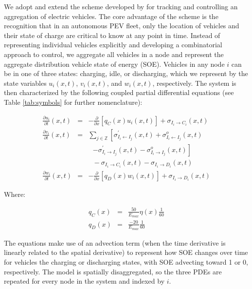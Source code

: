 \documentclass[journal]{IEEEtran}
\begin{document}
We adopt and extend the scheme developed by \cite{lefloch_pde_2016} for tracking and controlling an aggregation of electric vehicles. The core advantage of the scheme is the recognition that in an autonomous PEV fleet, only the location of vehicles and their state of charge are critical to know at any point in time. Instead of representing individual vehicles explicitly and developing a combinatorial approach to control, we aggregate all vehicles in a node and represent the aggregate distribution vehicle state of energy (SOE). Vehicles in any node $i$ can be in one of three states: charging, idle, or discharging, which we represent by the state variables $u_i(x,t)$, $v_i(x,t)$, and $w_i(x,t)$, respectively. The system is then characterized by the following coupled partial differential equations (see Table \ref{tab:symbols} for further nomenclature):

\begin{eqnarray*}
    \frac{\partial u_i}{\partial t}(x,t) &=& -\frac{\partial}{\partial x}\left[ q_C(x) u_i(x,t) \right] + \sigma_{I_i \rightarrow C_i}(x,t) \\
    \frac{\partial v_i}{\partial t}(x,t) &=& \sum_{j\in\mathbb{Z}} \left[ \sigma_{I_i \leftarrow I_j}^\prime(x,t) + \sigma_{I_i \leftarrow I_j}^o(x,t) \right. \\
    & & ~~~ \left. - \sigma_{I_i \rightarrow I_j}^\prime(x,t) - \sigma_{I_i \rightarrow I_j}^o(x,t) \right] \\
    && ~~~ - \sigma_{I_i \rightarrow C_i}(x,t) - \sigma_{I_i \rightarrow D_i}(x,t) \\
    \frac{\partial w_i}{\partial t}(x,t) &=& -\frac{\partial}{\partial x}\left[ q_D(x) w_i(x,t) \right] + \sigma_{I_i \rightarrow D_i}(x,t) 
\end{eqnarray*}

Where: 

\begin{eqnarray*}
q_C(x) &=& \frac{50}{E_{max}}\eta(x)\frac{1}{60} \\
q_D(x) &=& \frac{-20}{E_{max}}\frac{1}{60}
\end{eqnarray*}

The equations make use of an advection term (when the time derivative is linearly related to the spatial derivative) to represent how SOE changes over time for vehicles the charging or discharging states, with SOE advecting toward 1 or 0, respectively. The model is spatially disaggregated, so the three PDEs are repeated for every node in the system and indexed by $i$.
\end{document}
